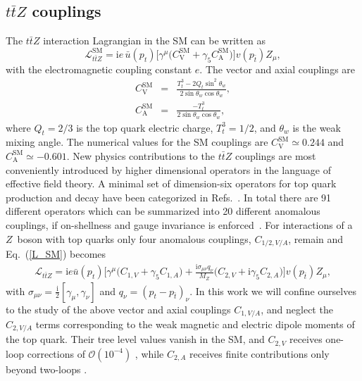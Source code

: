 \documentclass{JHEP3}
\newcommand{\mrm}{\mathrm}
\def\ttbZ{t\bar{t}Z}
\def\sw{\sin \theta_w}
\def\swsq{\sin^2 \theta_w}
\def\cw{\cos \theta_w}
\def\ConeVSM{C_\mathrm{V}^{\mrm{SM}}}
\def\ConeASM{C_\mathrm{A}^{\mrm{SM}}}
\newcommand{\be}{\begin{eqnarray}}
\newcommand{\ee}{\end{eqnarray}}
\begin{document}
\subsection{$\ttbZ$ couplings}   \label{sect:ttzcoupl}
The $\ttbZ$ interaction Lagrangian in the SM can be written as
\begin{equation} 
  \label{L_SM}
  \mathcal{L}_{\ttbZ}^{\mrm{SM}} = \mathrm{i} e \, \bar{u}(p_t)\biggl[ \gamma^{\mu} \bigl( \ConeVSM + \gamma_5 \ConeASM \bigr) \biggr]v(p_{\bar{t}}) Z_{\mu},
  \end{equation}
  with the electromagnetic coupling constant $e$. The vector and axial couplings are 
\be
  \ConeVSM &=& \frac{T^3_t - 2Q_t \swsq}{2\sw \cw}, \nonumber \\
  \ConeASM &=& \frac{-T^3_t}{2 \sw \cw},  
\ee
where $Q_t = 2/3$ is the top quark electric charge, $T^3_t=1/2$, and $\theta_w$ is the weak mixing angle. 
The numerical values for the SM couplings are $\ConeVSM \simeq 0.244$ and $\ConeASM \simeq -0.601$.
New physics contributions to the $\ttbZ$ couplings are most conveniently introduced by higher dimensional operators 
in the language of effective field theory. 
A minimal set of dimension-six operators for top quark production and decay have been categorized in Refs.~\cite{AlcarazMaestre:2012vp,AguilarSaavedra:2008zc,Zhang:2012cd}.
In total there are 91 different operators which can be summarized into 20 different anomalous couplings, if on-shellness and gauge invariance is enforced~\cite{AguilarSaavedra:2008zc}. 
For interactions of a $Z$~boson with top quarks only four anomalous couplings, $C_{1/2,V/A}$, remain and Eq.~(\ref{L_SM}) becomes
\be
  \label{L_NP}
  \mathcal{L}_{\ttbZ} = \mathrm{i} e \bar{u}(p_t)\biggl[ \gamma^{\mu} \bigl(C_{1,V} + \gamma_5 C_{1,A} \bigr)
  + \frac{\mathrm{i} \sigma_{\mu \nu} q_{\nu}}{M_Z} 
  \bigl(C_{2,V} + \mathrm{i} \gamma_5 C_{2,A} \bigr) \biggr] v(p_{\bar{t}}) Z_{\mu} ,
\ee
with $\sigma_{\mu \nu}=\frac{\mathrm{i}}{2} [ \gamma_{\mu},\gamma_{\nu} ]$ and $q_{\nu} = (p_{t}-p_{\bar{t}})_{\nu}$.
In this work we will confine ourselves to the study of the above vector and axial couplings $C_{1,V/A}$, and neglect the $C_{2,V/A}$ terms corresponding to the weak magnetic and electric dipole moments of the top quark. 
Their tree level values vanish in the SM, and $C_{2,V}$ receives one-loop corrections of $ \mathcal{O}(10^{-4})$ \cite{Bernabeu:1995gs}, while $C_{2,A}$ receives finite contributions only beyond two-loops \cite{Hollik:1998vz}. 
\end{document}
